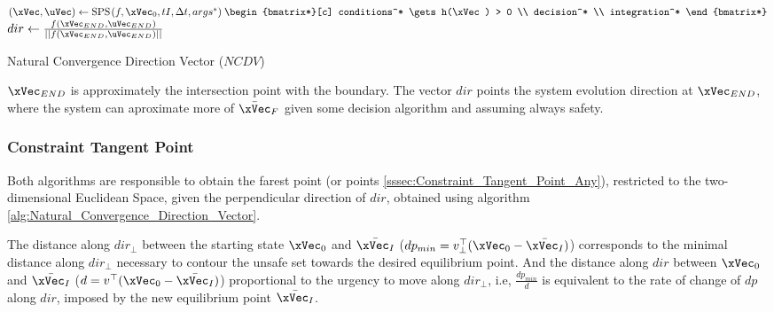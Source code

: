 
  \begin{algorithm}
    $(\xVec, \uVec) \gets \text{SPS}\hspace{0.1em}(f, \xVec_0, tI, \Delta t, args^*) \hspace{0.25em} \begin{bmatrix*}[c]  conditions^* \gets h(\xVec) > 0 \\ decision^* \\ integration^* \end{bmatrix*}$  
    $dir \gets \frac{f(\xVec_{END}, \uVec_{END})}{||f(\xVec_{END}, \uVec_{END})||}$ 
    \caption{Natural Convergence Direction Vector (\(NCDV\))} \label{alg:Natural_Convergence_Direction_Vector}
  \end{algorithm}

\(\xVec_{END}\) is approximately the intersection point with the boundary. The vector \(dir\) points the system evolution direction at \(\xVec_{END}\), where the system can aproximate more of \(\bar{\xVec}_F\) given some decision algorithm and assuming always safety. 

\subsubsection{Constraint Tangent Point}
\label{subsubsec:Constraint_Tangent_Point}

Both algorithms are responsible to obtain the farest point (or points \ref{sssec:Constraint_Tangent_Point_Any}), restricted to the two-dimensional Euclidean Space, given the perpendicular direction of \(dir\), obtained using algorithm \ref{alg:Natural_Convergence_Direction_Vector}.\par
The distance along \(dir_{\perp}\) between the starting state \(\xVec_0\) and \(\bar{\xVec_I}\) (\(dp_{min} = v_{\perp}^{\top}(\xVec_0 - \bar{\xVec_I})\)) corresponds to the minimal distance along \(dir_{\perp}\) necessary to contour the unsafe set towards the desired equilibrium point. And the distance along \(dir\) between \(\xVec_0\) and \(\bar{\xVec_I}\) (\(d = v^{\top}(\xVec_0 - \bar{\xVec_I})\))  proportional to the urgency to move along \(dir_{\perp}\), i.e, \(\frac{dp_{min}}{d}\) is equivalent to the rate of change of \(dp\) along \(dir\), imposed by the new equilibrium point \(\bar{\xVec_I}\). %
 

